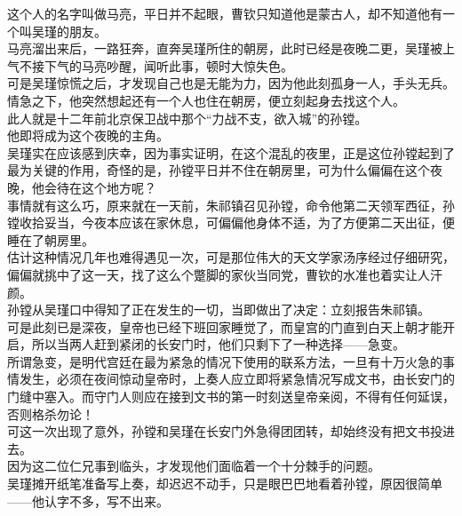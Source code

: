 \begin{multicols}{\theparacolNo}
这个人的名字叫做马亮，平日并不起眼，曹钦只知道他是蒙古人，却不知道他有一个叫吴瑾的朋友。\\

马亮溜出来后，一路狂奔，直奔吴瑾所住的朝房，此时已经是夜晚二更，吴瑾被上气不接下气的马亮吵醒，闻听此事，顿时大惊失色。\\

可是吴瑾惊慌之后，才发现自己也是无能为力，因为他此刻孤身一人，手头无兵。情急之下，他突然想起还有一个人也住在朝房，便立刻起身去找这个人。\\

此人就是十二年前北京保卫战中那个“力战不支，欲入城”的孙镗。\\

他即将成为这个夜晚的主角。\\

吴瑾实在应该感到庆幸，因为事实证明，在这个混乱的夜里，正是这位孙镗起到了最为关键的作用，奇怪的是，孙镗平日并不住在朝房里，可为什么偏偏在这个夜晚，他会待在这个地方呢？\\

事情就有这么巧，原来就在一天前，朱祁镇召见孙镗，命令他第二天领军西征，孙镗收拾妥当，今夜本应该在家休息，可偏偏他身体不适，为了方便第二天出征，便睡在了朝房里。\\

估计这种情况几年也难得遇见一次，可是那位伟大的天文学家汤序经过仔细研究，偏偏就挑中了这一天，找了这么个蹩脚的家伙当同党，曹钦的水准也着实让人汗颜。\\

孙镗从吴瑾口中得知了正在发生的一切，当即做出了决定：立刻报告朱祁镇。\\

可是此刻已是深夜，皇帝也已经下班回家睡觉了，而皇宫的门直到白天上朝才能开启，所以当两人赶到紧闭的长安门时，他们只剩下了一种选择——急变。\\

所谓急变，是明代宫廷在最为紧急的情况下使用的联系方法，一旦有十万火急的事情发生，必须在夜间惊动皇帝时，上奏人应立即将紧急情况写成文书，由长安门的门缝中塞入。而守门人则应在接到文书的第一时刻送皇帝亲阅，不得有任何延误，否则格杀勿论！\\

可这一次出现了意外，孙镗和吴瑾在长安门外急得团团转，却始终没有把文书投进去。\\

因为这二位仁兄事到临头，才发现他们面临着一个十分棘手的问题。\\

吴瑾摊开纸笔准备写上奏，却迟迟不动手，只是眼巴巴地看着孙镗，原因很简单——他认字不多，写不出来。\\


\end{multicols}
